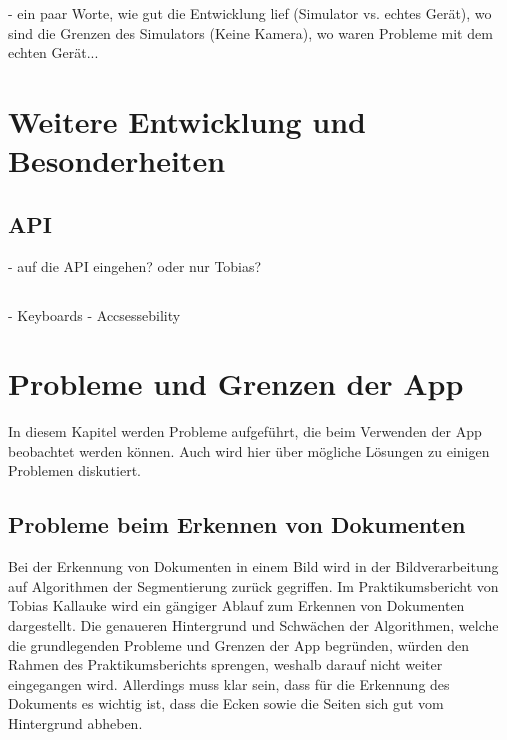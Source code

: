 \documentclass[nomenclature, oneside, 150]{HSMW-Thesis}
\begin{document}
	- ein paar Worte, wie gut die Entwicklung lief (Simulator vs. echtes Gerät), wo sind die Grenzen des Simulators (Keine Kamera), wo waren Probleme mit dem echten Gerät...


\chapter{Weitere Entwicklung und Besonderheiten}
	
	\section{API}
		- auf die API eingehen? oder nur Tobias?
	
	\section{}
		- Keyboards
		- Accsessebility
		

\chapter{Probleme und Grenzen der App}\label{ch:grenzen}
	In diesem Kapitel werden Probleme aufgeführt, die beim Verwenden der App beobachtet werden können. Auch wird hier über mögliche Lösungen zu einigen Problemen diskutiert.

	\section{Probleme beim Erkennen von Dokumenten}\label{sc:erkennen}
		Bei der Erkennung von Dokumenten in einem Bild wird in der Bildverarbeitung auf Algorithmen der Segmentierung zurück gegriffen. Im Praktikumsbericht von Tobias Kallauke wird ein gängiger Ablauf zum Erkennen von Dokumenten dargestellt. Die genaueren Hintergrund und Schwächen der Algorithmen, welche die grundlegenden Probleme und Grenzen der App begründen, würden den Rahmen des Praktikumsberichts sprengen, weshalb darauf nicht weiter eingegangen wird. Allerdings muss klar sein, dass für die Erkennung des Dokuments es wichtig ist, dass die Ecken sowie die Seiten sich gut vom Hintergrund abheben.
		
\end{document}
